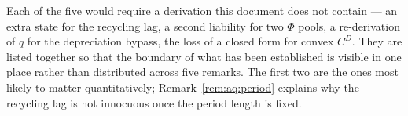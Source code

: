 Each of the five would require a derivation this document does not contain --- an extra state for the recycling lag, a second liability for two $\Phi$ pools, a re-derivation of $q$ for the depreciation bypass, the loss of a closed form for convex $C^D$. They are listed together so that the boundary of what has been established is visible in one place rather than distributed across five remarks. The first two are the ones most likely to matter quantitatively; Remark~\ref{rem:aq:period} explains why the recycling lag is not innocuous once the period length is fixed.
